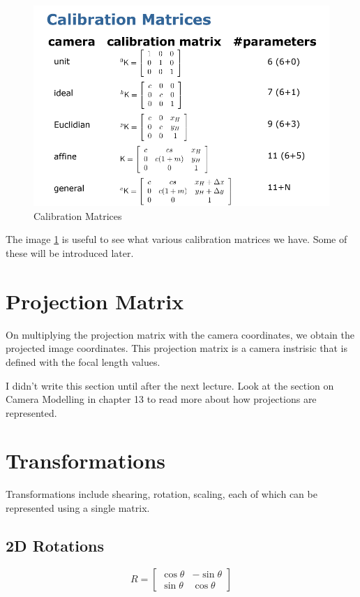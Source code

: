 \begin{figure}[h]
    \centering
    \includegraphics[width=12cm]{img/calibration-matrices.png}
    \caption{Calibration Matrices}
    \label{fig:calibration}
\end{figure}

The image \ref{fig:calibration} is useful to see what various calibration matrices we have. Some of these will be introduced later. 

\section{Projection Matrix}

On multiplying the projection matrix with the camera coordinates, we obtain the projected image coordinates. This projection matrix is a camera instrisic that is defined with the focal length values. 

I didn't write this section until after the next lecture. Look at the section on Camera Modelling in chapter 13 to read more about how projections are represented.

\section{Transformations}

Transformations include shearing, rotation, scaling, each of which can be represented using a single matrix.

\subsection{2D Rotations}

\begin{equation}
    R = \begin{bmatrix}
    \cos\theta & -\sin\theta \\
    \sin\theta & \cos\theta 
    \end{bmatrix}
\end{equation}

